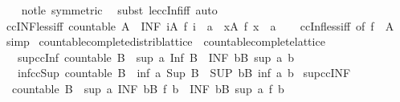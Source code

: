 \begin{isabellebody}
%
\isadelimproof
\ \ %
\endisadelimproof
%
\isatagproof
{}\isamarkupfalse%
\ not{\isacharunderscore}le\ {\isacharbrackleft}symmetric{\isacharbrackright}\ \isamarkupfalse%
\ {\isacharparenleft}subst\ le{\isacharunderscore}ccInf{\isacharunderscore}iff{\isacharparenright}\ auto%
\endisatagproof
{\isafoldproof}%
%
\isadelimproof
\isanewline
%
\endisadelimproof
\isanewline
{}\isamarkupfalse%
\ ccINF{\isacharunderscore}less{\isacharunderscore}iff{\isacharcolon}\ {\isachardoublequoteopen}countable\ A\ {\isasymLongrightarrow}\ {\isacharparenleft}INF\ i{\isacharcolon}A{\isachardot}\ f\ i{\isacharparenright}\ {\isacharless}\ a\ {\isasymlongleftrightarrow}\ {\isacharparenleft}{\isasymexists}x{\isasymin}A{\isachardot}\ f\ x\ {\isacharless}\ a{\isacharparenright}{\isachardoublequoteclose}\isanewline
%
\isadelimproof
\ \ %
\endisadelimproof
%
\isatagproof
{}\isamarkupfalse%
\ ccInf{\isacharunderscore}less{\isacharunderscore}iff\ {\isacharbrackleft}of\ {\isachardoublequoteopen}f\ {\isacharbackquote}\ A{\isachardoublequoteclose}{\isacharbrackright}\ \isamarkupfalse%
\ simp%
\endisatagproof
{\isafoldproof}%
%
\isadelimproof
\isanewline
%
\endisadelimproof
\isanewline
{}\isamarkupfalse%
\isanewline
\isanewline
{}\isamarkupfalse%
\ countable{\isacharunderscore}complete{\isacharunderscore}distrib{\isacharunderscore}lattice\ {\isacharequal}\ countable{\isacharunderscore}complete{\isacharunderscore}lattice\ {\isacharplus}\isanewline
\ \ \ sup{\isacharunderscore}ccInf{\isacharcolon}\ {\isachardoublequoteopen}countable\ B\ {\isasymLongrightarrow}\ sup\ a\ {\isacharparenleft}Inf\ B{\isacharparenright}\ {\isacharequal}\ {\isacharparenleft}INF\ b{\isacharcolon}B{\isachardot}\ sup\ a\ b{\isacharparenright}{\isachardoublequoteclose}\isanewline
\ \ \ inf{\isacharunderscore}ccSup{\isacharcolon}\ {\isachardoublequoteopen}countable\ B\ {\isasymLongrightarrow}\ inf\ a\ {\isacharparenleft}Sup\ B{\isacharparenright}\ {\isacharequal}\ {\isacharparenleft}SUP\ b{\isacharcolon}B{\isachardot}\ inf\ a\ b{\isacharparenright}{\isachardoublequoteclose}\isanewline
{}\isanewline
\isanewline
{}\isamarkupfalse%
\ sup{\isacharunderscore}ccINF{\isacharcolon}\isanewline
\ \ {\isachardoublequoteopen}countable\ B\ {\isasymLongrightarrow}\ sup\ a\ {\isacharparenleft}INF\ b{\isacharcolon}B{\isachardot}\ f\ b{\isacharparenright}\ {\isacharequal}\ {\isacharparenleft}INF\ b{\isacharcolon}B{\isachardot}\ sup\ a\ {\isacharparenleft}f\ b{\isacharparenright}{\isacharparenright}{\isachardoublequoteclose}\isanewline

\end{isabellebody}

